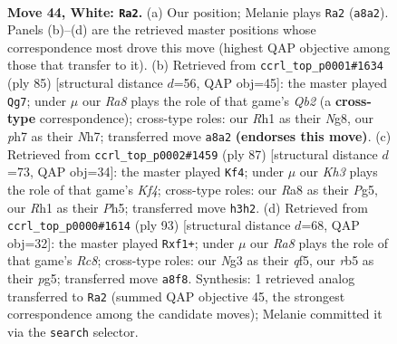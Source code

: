 \documentclass[11pt]{article}
\begin{document}
\clearpage

\begin{figure}[p]\centering
\begin{subfigure}{0.46\textwidth}\centering
\resizebox{\linewidth}{!}{%
\newchessgame
\chessboard[
  setfen={R4n1k/1pQ4p/8/1r5p/1q6/6NK/8/7R w - - 0 44},
  showmover=false,
  pgfstyle=straightmove, color=movearrow, markmove={a8-a2}
]}
\caption{}
\end{subfigure}\hfill
\begin{subfigure}{0.46\textwidth}\centering
\resizebox{\linewidth}{!}{%
\newchessgame
\chessboard[
  setfen={6nk/1q5n/8/8/3PN1P1/2P2Q2/2r5/5RK1 b - - 0 43},
  showmover=false,
  pgfstyle=straightmove, color=movearrow, markmove={b7-g7}
]}
\caption{}
\end{subfigure}
\\[4pt]
\begin{subfigure}{0.46\textwidth}\centering
\resizebox{\linewidth}{!}{%
\newchessgame
\chessboard[
  setfen={8/8/8/4nkpp/8/PR5P/rPN1K3/8 b - - 13 44},
  showmover=false,
  pgfstyle=straightmove, color=movearrow, markmove={f5-f4}
]}
\caption{}
\end{subfigure}\hfill
\begin{subfigure}{0.46\textwidth}\centering
\resizebox{\linewidth}{!}{%
\newchessgame
\chessboard[
  setfen={6k1/8/8/1P1qPQPp/7P/3p4/8/2r2RK1 b - - 2 47},
  showmover=false,
  pgfstyle=straightmove, color=movearrow, markmove={c1-f1}
]}
\caption{}
\end{subfigure}
\caption{\textbf{Move 44, White: \texttt{Ra2}.} (a) Our position; Melanie plays \texttt{Ra2} (\texttt{a8a2}). Panels (b)--(d) are the retrieved master positions whose correspondence most drove this move (highest QAP objective among those that transfer to it). (b) Retrieved from \texttt{ccrl\_top\_p0001\#1634} (ply 85) [structural distance $d$=56, QAP obj=45]: the master played \texttt{Qg7}; under $\mu$ our \emph{Ra8} plays the role of that game's \emph{Qb2} (a \textbf{cross-type} correspondence); cross-type roles: our \emph{R}h1 as their \emph{N}g8, our \emph{p}h7 as their \emph{N}h7; transferred move \texttt{a8a2} \textbf{(endorses this move)}. (c) Retrieved from \texttt{ccrl\_top\_p0002\#1459} (ply 87) [structural distance $d$=73, QAP obj=34]: the master played \texttt{Kf4}; under $\mu$ our \emph{Kh3} plays the role of that game's \emph{Kf4}; cross-type roles: our \emph{R}a8 as their \emph{P}g5, our \emph{R}h1 as their \emph{P}h5; transferred move \texttt{h3h2}. (d) Retrieved from \texttt{ccrl\_top\_p0000\#1614} (ply 93) [structural distance $d$=68, QAP obj=32]: the master played \texttt{Rxf1+}; under $\mu$ our \emph{Ra8} plays the role of that game's \emph{Rc8}; cross-type roles: our \emph{N}g3 as their \emph{q}f5, our \emph{r}b5 as their \emph{p}g5; transferred move \texttt{a8f8}. Synthesis: 1 retrieved analog transferred to \texttt{Ra2} (summed QAP objective 45, the strongest correspondence among the candidate moves); Melanie committed it via the \texttt{search} selector.}
\label{fig:thought-m86}
\end{figure}
\end{document}
